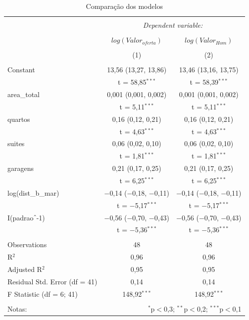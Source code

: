 \documentclass{article}
\begin{document}
\begin{table}[H] \centering 
  \caption{Comparação dos modelos} 
  \label{} 
\begin{tabular}{@{\extracolsep{5pt}}lcc} 
\\[-1.8ex]\hline 
\hline \\[-1.8ex] 
 & \multicolumn{2}{c}{\textit{Dependent variable:}} \\ 
\cline{2-3} 
\\[-1.8ex] & $log(Valor_{oferta})$ & $log(Valor_{Hom})$ \\ 
\\[-1.8ex] & (1) & (2)\\ 
\hline \\[-1.8ex] 
 Constant & 13,56 (13,27, 13,86) & 13,46 (13,16, 13,75) \\ 
  & t = 58,85$^{***}$ & t = 58,39$^{***}$ \\ 
  area\_total & 0,001 (0,001, 0,002) & 0,001 (0,001, 0,002) \\ 
  & t = 5,11$^{***}$ & t = 5,11$^{***}$ \\ 
  quartos & 0,16 (0,12, 0,21) & 0,16 (0,12, 0,21) \\ 
  & t = 4,63$^{***}$ & t = 4,63$^{***}$ \\ 
  suites & 0,06 (0,02, 0,10) & 0,06 (0,02, 0,10) \\ 
  & t = 1,81$^{***}$ & t = 1,81$^{***}$ \\ 
  garagens & 0,21 (0,17, 0,25) & 0,21 (0,17, 0,25) \\ 
  & t = 6,25$^{***}$ & t = 6,25$^{***}$ \\ 
  log(dist\_b\_mar) & $-$0,14 ($-$0,18, $-$0,11) & $-$0,14 ($-$0,18, $-$0,11) \\ 
  & t = $-$5,17$^{***}$ & t = $-$5,17$^{***}$ \\ 
  I(padrao$\hat{\mkern6mu}$-1) & $-$0,56 ($-$0,70, $-$0,43) & $-$0,56 ($-$0,70, $-$0,43) \\ 
  & t = $-$5,36$^{***}$ & t = $-$5,36$^{***}$ \\ 
 \hline \\[-1.8ex] 
Observations & 48 & 48 \\ 
R$^{2}$ & 0,96 & 0,96 \\ 
Adjusted R$^{2}$ & 0,95 & 0,95 \\ 
Residual Std. Error (df = 41) & 0,14 & 0,14 \\ 
F Statistic (df = 6; 41) & 148,92$^{***}$ & 148,92$^{***}$ \\ 
\hline 
\hline \\[-1.8ex] 
Notas: & \multicolumn{2}{r}{$^{*}$p$<$0,3; $^{**}$p$<$0,2; $^{***}$p$<$0,1} \\ 
\end{tabular} 
\end{table}
\end{document}
